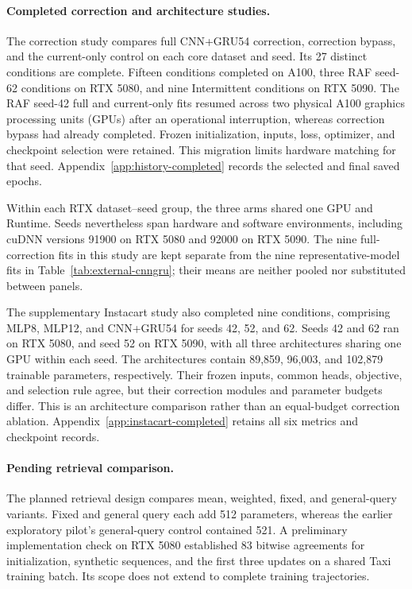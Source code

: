 \documentclass[runningheads]{llncs}
\begin{document}
\paragraph{Completed correction and architecture studies.}
The correction study compares full CNN+GRU54 correction, correction bypass, and the current-only control on each core dataset and seed. Its 27 distinct conditions are complete. Fifteen conditions completed on A100, three RAF seed-62 conditions on RTX 5080, and nine Intermittent conditions on RTX 5090. The RAF seed-42 full and current-only fits resumed across two physical A100 graphics processing units (GPUs) after an operational interruption, whereas correction bypass had already completed. Frozen initialization, inputs, loss, optimizer, and checkpoint selection were retained. This migration limits hardware matching for that seed. Appendix~\ref{app:history-completed} records the selected and final saved epochs.

Within each RTX dataset--seed group, the three arms shared one GPU and Runtime. Seeds nevertheless span hardware and software environments, including cuDNN versions 91900 on RTX 5080 and 92000 on RTX 5090. The nine full-correction fits in this study are kept separate from the nine representative-model fits in Table~\ref{tab:external-cnngru}; their means are neither pooled nor substituted between panels.

The supplementary Instacart study also completed nine conditions, comprising MLP8, MLP12, and CNN+GRU54 for seeds 42, 52, and 62. Seeds 42 and 62 ran on RTX 5080, and seed 52 on RTX 5090, with all three architectures sharing one GPU within each seed. The architectures contain 89,859, 96,003, and 102,879 trainable parameters, respectively. Their frozen inputs, common heads, objective, and selection rule agree, but their correction modules and parameter budgets differ. This is an architecture comparison rather than an equal-budget correction ablation. Appendix~\ref{app:instacart-completed} retains all six metrics and checkpoint records.

\paragraph{Pending retrieval comparison.}
The planned retrieval design compares mean, weighted, fixed, and general-query variants. Fixed and general query each add 512 parameters, whereas the earlier exploratory pilot's general-query control contained 521. A preliminary implementation check on RTX 5080 established 83 bitwise agreements for initialization, synthetic sequences, and the first three updates on a shared Taxi training batch. Its scope does not extend to complete training trajectories.
\end{document}
